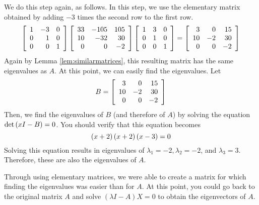 \begin{solution}
We do this step again, as follows. In this step, we use the elementary matrix obtained by adding $-3$
times the second row to the first row. 
\begin{equation}
\left[
\begin{array}{rrr}
1 & -3 & 0 \\
0 &  1 & 0 \\
0 &  0 & 1
\end{array}
\right] \left[
\begin{array}{rrr}
33 & -105 & 105 \\
10 & -32  & 30 \\
0  &   0  & -2
\end{array} 
\right] \left[
\begin{array}{rrr}
1 & 3 & 0 \\
0 & 1 & 0 \\
0 & 0 & 1
\end{array}
\right] =\left[
\begin{array}{rrr}
3  & 0  & 15 \\
10 & -2 & 30 \\
0  & 0  & -2
\end{array}
\right]  \label{elemeigenvalue}
\end{equation}
Again by Lemma \ref{lem:similarmatrices}, this resulting matrix has the same eigenvalues as $A$. 
At this point, we can easily find the eigenvalues.
Let 
\begin{equation*}
B = \left[
\begin{array}{rrr}
3  & 0  & 15 \\
10 & -2 & 30 \\
0  & 0  & -2
\end{array}
\right] 
\end{equation*}
Then, we find the eigenvalues of $B$ (and therefore of $A$) by solving the equation 
$\det \left( x I - B  \right) = 0$.
You should verify that this equation becomes
\begin{equation*}
\left(x  +2 \right) \left( x  +2 \right) \left( x  - 3 \right)
=0
\end{equation*}
Solving this equation results in eigenvalues of $\lambda_1 = -2, \lambda_2 = -2$, and $\lambda_3 = 3$.
Therefore, these are also the eigenvalues of $A$. 

\end{solution}

Through using elementary matrices, we were able to create a matrix for
which finding the eigenvalues was easier than for $A$. At this point,
you could go back to the original matrix $A$ and solve $\left(
\lambda I - A \right) X = 0$ to obtain the eigenvectors of $A$.

